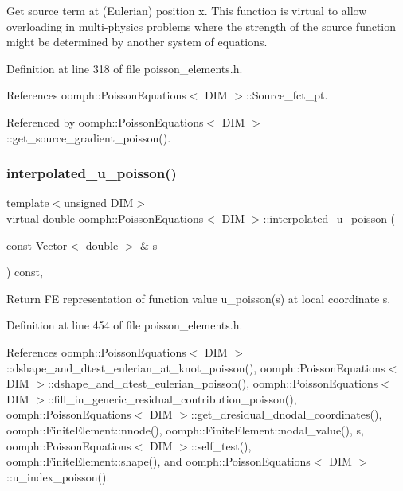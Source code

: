 Get source term at (Eulerian) position x. This function is virtual to allow overloading in multi-\/physics problems where the strength of the source function might be determined by another system of equations. 

Definition at line 318 of file poisson\+\_\+elements.\+h.



References oomph\+::\+Poisson\+Equations$<$ D\+I\+M $>$\+::\+Source\+\_\+fct\+\_\+pt.



Referenced by oomph\+::\+Poisson\+Equations$<$ D\+I\+M $>$\+::get\+\_\+source\+\_\+gradient\+\_\+poisson().

\mbox{\label{classoomph_1_1PoissonEquations_a9f31492636bebfe62cdacaab4b529c69}} 
\subsubsection{\texorpdfstring{interpolated\+\_\+u\+\_\+poisson()}{interpolated\_u\_poisson()}}
{\footnotesize\ttfamily template$<$unsigned D\+IM$>$ \\
virtual double \hyperlink{classoomph_1_1PoissonEquations}{oomph\+::\+Poisson\+Equations}$<$ D\+IM $>$\+::interpolated\+\_\+u\+\_\+poisson (\begin{DoxyParamCaption}\item[{const \hyperlink{classoomph_1_1Vector}{Vector}$<$ double $>$ \&}]{s }\end{DoxyParamCaption}) const\hspace{0.3cm}{\ttfamily [inline]}, {\ttfamily [virtual]}}



Return FE representation of function value u\+\_\+poisson(s) at local coordinate s. 



Definition at line 454 of file poisson\+\_\+elements.\+h.



References oomph\+::\+Poisson\+Equations$<$ D\+I\+M $>$\+::dshape\+\_\+and\+\_\+dtest\+\_\+eulerian\+\_\+at\+\_\+knot\+\_\+poisson(), oomph\+::\+Poisson\+Equations$<$ D\+I\+M $>$\+::dshape\+\_\+and\+\_\+dtest\+\_\+eulerian\+\_\+poisson(), oomph\+::\+Poisson\+Equations$<$ D\+I\+M $>$\+::fill\+\_\+in\+\_\+generic\+\_\+residual\+\_\+contribution\+\_\+poisson(), oomph\+::\+Poisson\+Equations$<$ D\+I\+M $>$\+::get\+\_\+dresidual\+\_\+dnodal\+\_\+coordinates(), oomph\+::\+Finite\+Element\+::nnode(), oomph\+::\+Finite\+Element\+::nodal\+\_\+value(), s, oomph\+::\+Poisson\+Equations$<$ D\+I\+M $>$\+::self\+\_\+test(), oomph\+::\+Finite\+Element\+::shape(), and oomph\+::\+Poisson\+Equations$<$ D\+I\+M $>$\+::u\+\_\+index\+\_\+poisson().




